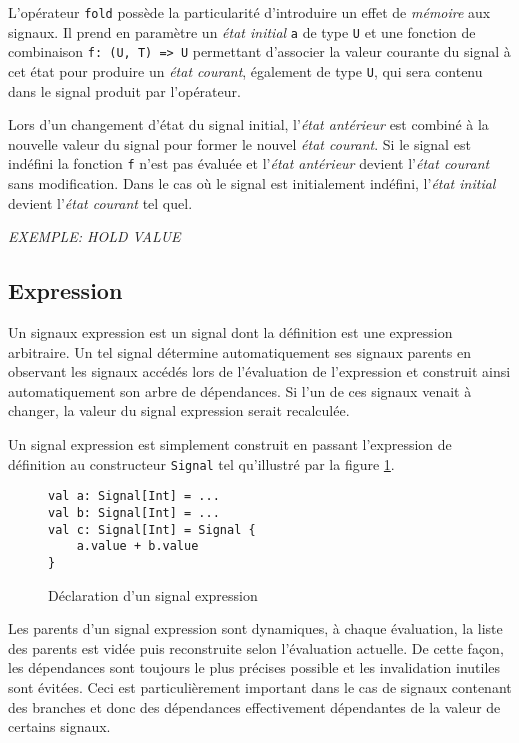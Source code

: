 L'opérateur \texttt{fold} possède la particularité d'introduire un effet de \emph{mémoire} aux signaux. Il prend en paramètre un \emph{état initial} \texttt{a} de type \texttt{U} et une fonction de combinaison \texttt{f: (U, T) => U} permettant d'associer la valeur courante du signal à cet état pour produire un \emph{état courant}, également de type \texttt{U}, qui sera contenu dans le signal produit par l'opérateur.

Lors d'un changement d'état du signal initial, l'\emph{état antérieur} est combiné à la nouvelle valeur du signal pour former le nouvel \emph{état courant}. Si le signal est indéfini la fonction \texttt{f} n'est pas évaluée et l'\emph{état antérieur} devient l'\emph{état courant} sans modification. Dans le cas où le signal est initialement indéfini, l'\emph{état initial} devient l'\emph{état courant} tel quel.

\textit{EXEMPLE: HOLD VALUE}

\subsection{Expression}
\label{sec:sig-expr}

Un signaux expression est un signal dont la définition est une expression arbitraire. Un tel signal détermine automatiquement ses signaux parents en observant les signaux accédés lors de l'évaluation de l'expression et construit ainsi automatiquement son arbre de dépendances. Si l'un de ces signaux venait à changer, la valeur du signal expression serait recalculée.

Un signal expression est simplement construit en passant l'expression de définition au constructeur \texttt{Signal} tel qu'illustré par la figure \ref{fig:signal-expr-init}.

\begin{figure}[!h]
	\begin{lstlisting}
val a: Signal[Int] = ...
val b: Signal[Int] = ...
val c: Signal[Int] = Signal {
	a.value + b.value
}
	\end{lstlisting}
	\caption{Déclaration d'un signal expression}
	\label{fig:signal-expr-init}
\end{figure}

Les parents d'un signal expression sont dynamiques, à chaque évaluation, la liste des parents est vidée puis reconstruite selon l'évaluation actuelle. De cette façon, les dépendances sont toujours le plus précises possible et les invalidation inutiles sont évitées. Ceci est particulièrement important dans le cas de signaux contenant des branches et donc des dépendances effectivement dépendantes de la valeur de certains signaux.

